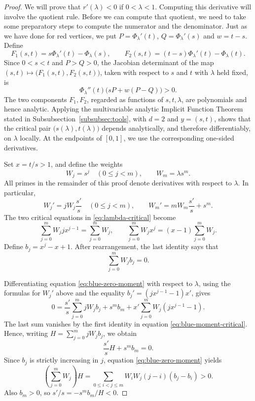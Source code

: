 \documentclass[11pt, onesided]{amsart}
\theoremstyle{remark}
\begin{document}
\begin{proof}
We will prove that $r'(\lambda) <0$  if $0< \lambda <1$. Computing this derivative will involve the quotient rule. Before we can compute that quotient, we need to take some preparatory steps to compute the numerator and the denominator. 
Just as we have done for red vertices,  we put $P=\Phi_\lambda'(t)$, $Q=\Phi_\lambda'(s)$ and $w=t-s$.
Define
\[
F_1(s,t)=s\Phi_\lambda'(t)-\Phi_\lambda(s),
\qquad
F_2(s,t)=(t-s)\Phi_\lambda'(t)-\Phi_\lambda(t).
\]
Since $0<s<t$ and $P>Q>0$, the Jacobian determinant of the map
$(s,t)\mapsto \big(F_1(s,t),F_2(s,t)\big)$, taken with respect to $s$ and $t$
with $\lambda$ held fixed, is
\[
\Phi_\lambda''(t)\bigl(sP+w(P-Q)\bigr)>0.
\]
The two components $F_1,F_2$, regarded as functions of $s,t,\lambda$,
are polynomials and hence analytic. Applying the multivariable analytic
Implicit Function Theorem stated in Subsubsection~\ref{subsubsec:tools},
with $d=2$ and $y=(s,t)$, shows that the critical pair
$\big(s(\lambda),t(\lambda)\big)$ depends analytically, and therefore
differentiably, on $\lambda$ locally. At the endpoints of $[0,1]$,
we use the corresponding one-sided derivatives.

Set $x=t/s>1$, and define the weights
\[
W_j=s^j\quad(0\leq j<m),\qquad W_m=\lambda s^m.
\]
All primes in the remainder of this proof denote derivatives with respect
to $\lambda$. In particular,
\[
W_j'=jW_j\frac{s'}s\quad(0\leq j<m),
\qquad
W_m'=mW_m\frac{s'}s+s^m.
\]
The two critical equations in \eqref{eq:lambda-critical} become
\begin{equation}\label{eq:blue-moment-critical}
\sum_{j=0}^m W_j jx^{j-1}=\sum_{j=0}^m W_j,
\qquad
\sum_{j=0}^m W_j x^j=(x-1)\sum_{j=0}^m W_j.
\end{equation}
Define $b_j=x^j-x+1$. After rearrangement, the last identity says that
\begin{equation}\label{eq:blue-zero-moment}
\sum_{j=0}^m W_jb_j=0.
\end{equation}


Differentiating equation \eqref{eq:blue-zero-moment} with respect to
$\lambda$, using the formulas for $W_j'$ above and the equality
$b_j'=(jx^{j-1}-1)x'$, gives
\[
0=\frac{s'}s\sum_{j=0}^m jW_jb_j+s^m b_m
+x'\sum_{j=0}^m W_j(jx^{j-1}-1).
\]
The last sum vanishes by the first identity in equation
\eqref{eq:blue-moment-critical}. Hence, writing
$H=\sum_{j=0}^m jW_jb_j$, we obtain
\[
\frac{s'}s H+s^m b_m=0.
\]
Since $b_j$ is strictly increasing in $j$, equation
\eqref{eq:blue-zero-moment} yields
\[
\left(\sum_{j=0}^m W_j\right)H
=\sum_{0\leq i<j\leq m}W_iW_j(j-i)(b_j-b_i)>0.
\]
Also $b_m>0$, so $s'/s=-s^m b_m/H<0$.



\end{proof}
\end{document}
